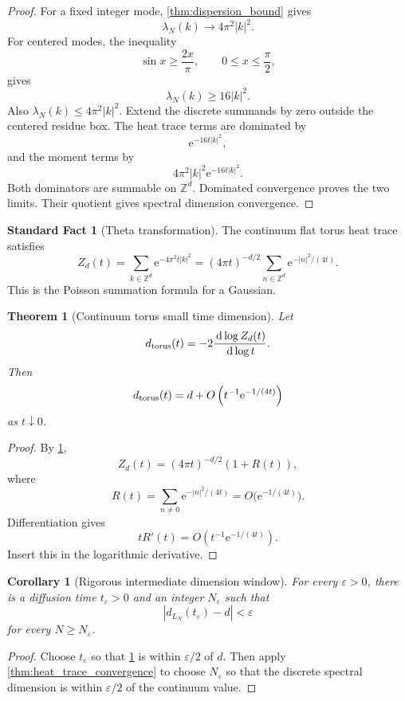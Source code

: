 \documentclass{aomart}
\newtheorem{theorem}{Theorem}[section]
\newtheorem{corollary}[corollary]{Corollary}
\theoremstyle{definition}
\newtheorem{standardfact}[standardfact]{Standard Fact}
\theoremstyle{remark}
\newcommand{\ZZ}{\mathbb Z}
\newcommand{\e}{\mathrm e}
\newcommand{\dd}{\,\mathrm d}
\newcommand{\abs}[1]{\left\lvert#1\right\rvert}
\begin{document}
\begin{proof}
For a fixed integer mode, \cref{thm:dispersion_bound} gives
\[
\lambda_N(k)\longrightarrow4\pi^2\abs{k}^2.
\]
For centered modes, the inequality
\[
\sin x\geq\frac{2x}{\pi},
\qquad
0\leq x\leq\frac\pi2,
\]
gives
\[
\lambda_N(k)\geq16\abs{k}^2.
\]
Also \(\lambda_N(k)\leq4\pi^2\abs{k}^2\). Extend the discrete summands by zero outside the centered residue box. The heat trace terms are dominated by
\[
\e^{-16t\abs{k}^2},
\]
and the moment terms by
\[
4\pi^2\abs{k}^2\e^{-16t\abs{k}^2}.
\]
Both dominators are summable on \(\ZZ^d\). Dominated convergence proves the two limits. Their quotient gives spectral dimension convergence.
\end{proof}

\begin{standardfact}[Theta transformation]\label{fact:theta_transform}
The continuum flat torus heat trace satisfies
\[
Z_d(t)
=
\sum_{k\in\ZZ^d}\e^{-4\pi^2t\abs{k}^2}
=
(4\pi t)^{-d/2}
\sum_{n\in\ZZ^d}\e^{-\abs{n}^2/(4t)}.
\]
This is the Poisson summation formula for a Gaussian.
\end{standardfact}

\begin{theorem}[Continuum torus small time dimension]\label{thm:continuum_dimension}
Let
\[
d_{\rm torus}(t)
=-2\frac{\dd\log Z_d(t)}{\dd\log t}.
\]
Then
\[
d_{\rm torus}(t)
=
 d+O\left(t^{-1}\e^{-1/(4t)}\right)
\]
as \(t\downarrow0\).
\end{theorem}

\begin{proof}
By \cref{fact:theta_transform},
\[
Z_d(t)
=(4\pi t)^{-d/2}(1+R(t)),
\]
where
\[
R(t)=\sum_{n\neq0}\e^{-\abs{n}^2/(4t)}
=O\bigl(\e^{-1/(4t)}\bigr).
\]
Differentiation gives
\[
tR'(t)=O\left(t^{-1}\e^{-1/(4t)}\right).
\]
Insert this in the logarithmic derivative.
\end{proof}

\begin{corollary}[Rigorous intermediate dimension window]\label{cor:dimension_window}
For every \(\varepsilon>0\), there is a diffusion time \(t_\varepsilon>0\) and an integer \(N_\varepsilon\) such that
\[
\abs{d_{L_N}(t_\varepsilon)-d}<\varepsilon
\]
for every \(N\geq N_\varepsilon\).
\end{corollary}

\begin{proof}
Choose \(t_\varepsilon\) so that \cref{thm:continuum_dimension} is within \(\varepsilon/2\) of \(d\). Then apply \cref{thm:heat_trace_convergence} to choose \(N_\varepsilon\) so that the discrete spectral dimension is within \(\varepsilon/2\) of the continuum value.
\end{proof}
\end{document}
